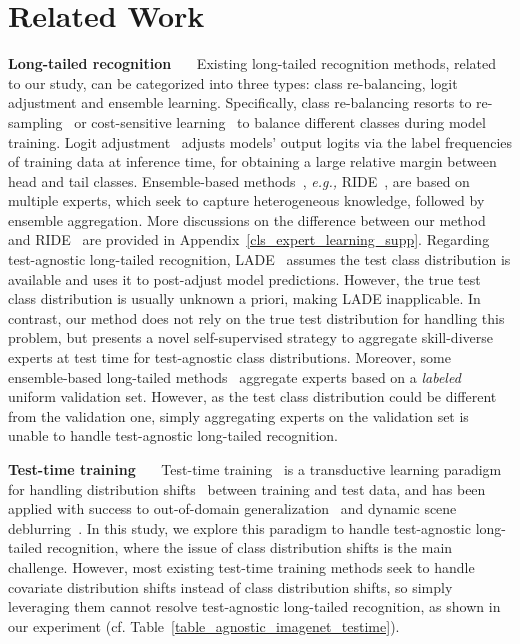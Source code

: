 \documentclass{article}
\def\eg{\emph{e.g.}} \def\Eg{\emph{E.g.}}
\def\eg{\emph{e.g., }}
\begin{document}
\section{Related Work}  
\textbf{Long-tailed recognition}~~~ 
Existing long-tailed recognition methods, related to our study, can be categorized into three types: class re-balancing, logit adjustment and ensemble learning. Specifically, class  re-balancing resorts to   re-sampling~\cite{chawla2002smote,guo2021long,huang2016learning,kang2019decoupling} or   cost-sensitive learning~\cite{cao2019learning,deng2021pml,he2022relieving,zhao2018adaptive} to balance different classes during model training. Logit adjustment~\cite{hong2020disentangling,menon2020long,peng2021optimal,tian2020posterior}   adjusts models' output logits   via the label frequencies of training data at inference time,  for obtaining a large relative margin between head  and tail classes. Ensemble-based methods~\cite{cai2021ace,guo2021long,xiang2020learning,zhou2020bbn}, \eg   RIDE~\cite{wang2020long}, are based on  multiple experts, which seek to capture heterogeneous knowledge, followed by ensemble aggregation. More discussions on the difference between our method  and RIDE~\cite{wang2020long}  are provided in Appendix~\ref{cls_expert_learning_supp}.
Regarding test-agnostic long-tailed recognition, LADE~\cite{hong2020disentangling} assumes the   test class distribution   is available  and uses it to post-adjust model predictions. However, the true test class distribution is usually unknown a priori, making LADE inapplicable. In contrast, our  method does not rely on the true test  distribution for   handling this problem, but presents   a novel self-supervised  strategy to aggregate skill-diverse experts at test time for    test-agnostic class  distributions. 
Moreover,  some ensemble-based long-tailed methods~\cite{sharma2020long}   aggregate   experts   based on a \emph{labeled} uniform validation set. However, as the test class distribution could be different from the   validation one, simply aggregating experts   on the validation set is unable to handle   test-agnostic long-tailed recognition. 

 
  
\textbf{Test-time training}~~~
Test-time training~\cite{kamani2020targeted,kim2020learning,liu2021ttt++,sun2020test,wang2021tent} is a transductive learning paradigm for handling    distribution shifts~\cite{lin2022prototype,long2014transfer,niu2022efficient,qiu2021source,varsavsky2020test,zhang2020collaborative} between training and test  data, and  has been applied with  success to   out-of-domain generalization~\cite{iwasawa2021test,pandey2021generalization} and  dynamic scene deblurring~\cite{chi2021test}. In this study, we  explore this  paradigm   to handle test-agnostic long-tailed recognition, where the issue of class distribution shifts is the main challenge.   However, most existing test-time training methods seek to handle covariate distribution shifts instead of  class distribution shifts, so simply leveraging  them   cannot resolve test-agnostic long-tailed recognition, as shown in our experiment (cf. Table~\ref{table_agnostic_imagenet_testime}).  
 
\end{document}
